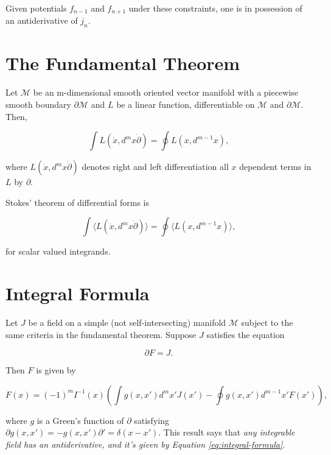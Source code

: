 \documentclass{article}
\begin{document}
Given potentials $f_{n-1}$ and $f_{n+1}$ under these constraints, one is in possession of an antiderivative of $j_n$.

\section{The Fundamental Theorem}

Let $\mathcal{M}$ be an m-dimensional smooth oriented vector manifold with a piecewise smooth boundary $\partial \mathcal{M}$ and $L$ be a linear function, differentiable on $\mathcal{M}$ and $\partial \mathcal{M}$. Then, \cite{cagc} \cite{sobczyk} \cite{gap}

\begin{equation}
  \int L(\dot x, d^mx \dot \partial) = \oint L(x, d^{m-1}x),\label{eq:fundamental-theorem}
\end{equation}

where $L(\dot x, d^mx \dot \partial)$ denotes right and left differentiation all $x$ dependent terms in $L$ by $\partial$.

Stokes' theorem of differential forms is

\begin{equation}
  \int \langle L(\dot x, d^mx \dot \partial)\rangle = \oint \langle L(x, d^{m-1}x)\rangle,
\end{equation}

for scalar valued integrands.

\section{Integral Formula}

Let $J$ be a field on a simple (not self-intersecting) manifold $\mathcal{M}$ subject to the same criteria in the fundamental theorem. Suppose $J$ satisfies the equation

\begin{equation}
  \partial F = J.
\end{equation}

Then $F$ is given by \cite{cagc}

\begin{equation}
  F(x) = (-1)^m I^{-1}(x) \left(\int g(x, x') d^{m}x' J(x') - \oint g(x, x') d^{m-1}x' F(x')\right),\label{eq:integral-formula}
\end{equation}

where $g$ is a Green's function of $\partial$ satisfying $\partial g(x,x') = - g(x, x') \partial' = \delta(x - x').$ This result says that \emph{any integrable field has an antiderivative, and it's given by Equation \ref{eq:integral-formula}}.
\end{document}

